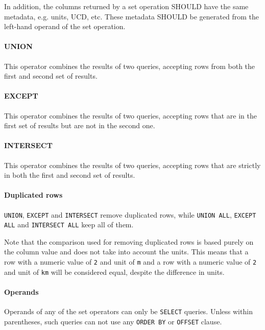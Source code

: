 \documentclass[11pt,a4paper]{ivoa}
\begin{document}
In addition, the columns returned by a set operation SHOULD have the same
metadata, e.g. units, UCD, etc. These metadata SHOULD be generated from the
left-hand operand of the set operation.

\paragraph{UNION}

This operator combines the results of two queries, accepting rows from
both the first and second set of results.

\paragraph{EXCEPT}

This operator combines the results of two queries, accepting rows that are
in the first set of results but are not in the second one.

\paragraph{INTERSECT}

This operator combines the results of two queries, accepting rows
that are strictly in both the first and second set of results.

\paragraph{Duplicated rows}

\verb:UNION:, \verb:EXCEPT: and \verb:INTERSECT: remove duplicated rows,
while \verb:UNION ALL:, \verb:EXCEPT ALL: and \verb:INTERSECT ALL: keep all of
them.

Note that the comparison used for removing duplicated rows is based purely on
the column value and does not take into account the units. This means that a row
with a numeric value of \verb:2: and unit of \verb:m: and a row with a numeric
value of \verb:2: and unit of \verb:km: will be considered equal, despite the
difference in units.

\paragraph{Operands}

Operands of any of the set operators can only be \verb:SELECT: queries.
Unless within parentheses, such queries can not use any \verb:ORDER BY: or
\verb:OFFSET: clause.
\end{document}
